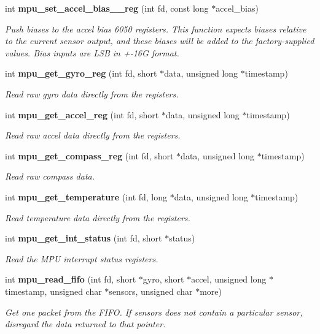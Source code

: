 \begin{DoxyCompactItemize}
int \textbf{ mpu\+\_\+set\+\_\+accel\+\_\+bias\+\_\+\_\+reg} (int fd, const long $\ast$accel\+\_\+bias)
\begin{DoxyCompactList}\small\item\em Push biases to the accel bias 6050 registers. This function expects biases relative to the current sensor output, and these biases will be added to the factory-\/supplied values. Bias inputs are L\+SB in +-\/16G format. \end{DoxyCompactList}\item 
int \textbf{ mpu\+\_\+get\+\_\+gyro\+\_\+reg} (int fd, short $\ast$data, unsigned long $\ast$timestamp)
\begin{DoxyCompactList}\small\item\em Read raw gyro data directly from the registers. \end{DoxyCompactList}\item 
int \textbf{ mpu\+\_\+get\+\_\+accel\+\_\+reg} (int fd, short $\ast$data, unsigned long $\ast$timestamp)
\begin{DoxyCompactList}\small\item\em Read raw accel data directly from the registers. \end{DoxyCompactList}\item 
int \textbf{ mpu\+\_\+get\+\_\+compass\+\_\+reg} (int fd, short $\ast$data, unsigned long $\ast$timestamp)
\begin{DoxyCompactList}\small\item\em Read raw compass data. \end{DoxyCompactList}\item 
int \textbf{ mpu\+\_\+get\+\_\+temperature} (int fd, long $\ast$data, unsigned long $\ast$timestamp)
\begin{DoxyCompactList}\small\item\em Read temperature data directly from the registers. \end{DoxyCompactList}\item 
int \textbf{ mpu\+\_\+get\+\_\+int\+\_\+status} (int fd, short $\ast$status)
\begin{DoxyCompactList}\small\item\em Read the M\+PU interrupt status registers. \end{DoxyCompactList}\item 
int \textbf{ mpu\+\_\+read\+\_\+fifo} (int fd, short $\ast$gyro, short $\ast$accel, unsigned long $\ast$timestamp, unsigned char $\ast$sensors, unsigned char $\ast$more)
\begin{DoxyCompactList}\small\item\em Get one packet from the F\+I\+FO. If {\itshape sensors} does not contain a particular sensor, disregard the data returned to that pointer. ~\newline

\end{DoxyCompactList}
\end{DoxyCompactItemize}
